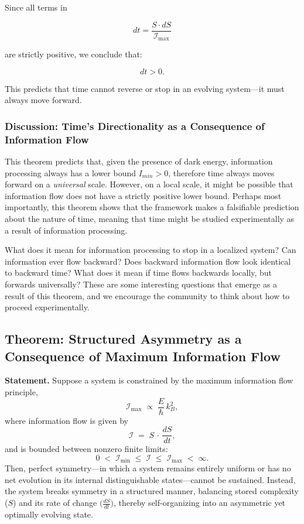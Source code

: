 \documentclass[12pt]{article}
\begin{document}
Since all terms in 

\begin{equation}
    dt = \frac{S \cdot dS}{\mathcal{I}_{\max}}
\end{equation}

are strictly positive, we conclude that:

\begin{equation}
    dt > 0.
\end{equation}

This predicts that time cannot reverse or stop in an evolving system—it must always move forward.


\subsubsection{Discussion: Time's Directionality as a Consequence of Information Flow}

This theorem predicts that, given the presence of dark energy, information processing always has a lower bound $I_{min} > 0$, therefore time always moves forward on a \textit{universal} scale. However, on a local scale, it might be possible that information flow does not have a strictly positive lower bound. Perhaps most importantly, this theorem shows that the framework makes a falsifiable prediction about the nature of time, meaning that time might be studied experimentally as a result of information processing.

What does it mean for information processing to stop in a localized system? Can information ever flow backward? Does backward information flow look identical to backward time? What does it mean if time flows backwards locally, but forwards universally? These are some interesting questions that emerge as a result of this theorem, and we encourage the community to think about how to proceed experimentally.

\subsection{Theorem: Structured Asymmetry as a Consequence of Maximum Information Flow}

\textbf{Statement.} Suppose a system is constrained by the maximum information flow principle,
\[
   \mathcal{I}_{\max} \;\propto\; \frac{E}{\hbar}\,k_B^2,
\]
where information flow is given by
\[
   \mathcal{I} \;=\; S \,\cdot\, \frac{dS}{dt},
\]
and is bounded between nonzero finite limits:
\[
   0 \;<\;\mathcal{I}_{\min} \;\le\; \mathcal{I} \;\le\; \mathcal{I}_{\max} \;<\;\infty.
\]
Then, perfect symmetry---in which a system remains entirely uniform or has no net evolution in its internal distinguishable states---cannot be sustained. Instead, the system breaks symmetry in a structured manner, balancing stored complexity (\(S\)) and its rate of change \(\bigl(\tfrac{dS}{dt}\bigr)\), thereby self-organizing into an asymmetric yet optimally evolving state.
\end{document}
